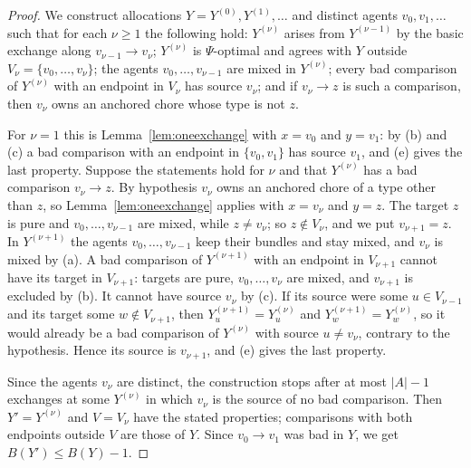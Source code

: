 \documentclass{amsart}
\numberwithin{equation}{section}
\theoremstyle{definition}
\theoremstyle{remark}
\begin{document}
\begin{proof}
We construct allocations $Y=Y^{(0)},Y^{(1)},\dots$ and distinct agents $v_0,v_1,\dots$ such that for each $\nu\ge1$ the following hold: $Y^{(\nu)}$ arises from $Y^{(\nu-1)}$ by the basic exchange along $v_{\nu-1}\to v_\nu$; $Y^{(\nu)}$ is $\Psi$-optimal and agrees with $Y$ outside $V_\nu =\{v_0,\dots,v_\nu\}$; the agents $v_0,\dots,v_{\nu-1}$ are mixed in $Y^{(\nu)}$; every bad comparison of $Y^{(\nu)}$ with an endpoint in $V_\nu$ has source $v_\nu$; and if $v_\nu\to z$ is such a comparison, then $v_\nu$ owns an anchored chore whose type is not $z$.

For $\nu =1$ this is Lemma~\ref{lem:oneexchange} with $x=v_0$ and $y=v_1$: by (b) and (c) a bad comparison with an endpoint in $\{v_0,v_1\}$ has source $v_1$, and (e) gives the last property. Suppose the statements hold for $\nu$ and that $Y^{(\nu)}$ has a bad comparison $v_\nu\to z$. By hypothesis $v_\nu$ owns an anchored chore of a type other than $z$, so Lemma~\ref{lem:oneexchange} applies with $x=v_\nu$ and $y=z$. The target $z$ is pure and $v_0,\dots,v_{\nu-1}$ are mixed, while $z\ne v_\nu$; so $z\notin V_\nu$, and we put $v_{\nu+1}=z$. In $Y^{(\nu+1)}$ the agents $v_0,\dots,v_{\nu-1}$ keep their bundles and stay mixed, and $v_\nu$ is mixed by (a). A bad comparison of $Y^{(\nu+1)}$ with an endpoint in $V_{\nu+1}$ cannot have its target in $V_{\nu+1}$: targets are pure, $v_0,\dots,v_\nu$ are mixed, and $v_{\nu+1}$ is excluded by (b). It cannot have source $v_\nu$ by (c). If its source were some $u\in V_{\nu-1}$ and its target some $w\notin V_{\nu+1}$, then $Y^{(\nu+1)}_u=Y^{(\nu)}_u$ and $Y^{(\nu+1)}_w=Y^{(\nu)}_w$, so it would already be a bad comparison of $Y^{(\nu)}$ with source $u\ne v_\nu$, contrary to the hypothesis. Hence its source is $v_{\nu+1}$, and (e) gives the last property.

Since the agents $v_\nu$ are distinct, the construction stops after at most $|A|-1$ exchanges at some $Y^{(\nu)}$ in which $v_\nu$ is the source of no bad comparison. Then $Y'=Y^{(\nu)}$ and $V=V_\nu$ have the stated properties; comparisons with both endpoints outside $V$ are those of $Y$. Since $v_0\to v_1$ was bad in $Y$, we get $B(Y')\le B(Y)-1$.
\end{proof}
\end{document}
